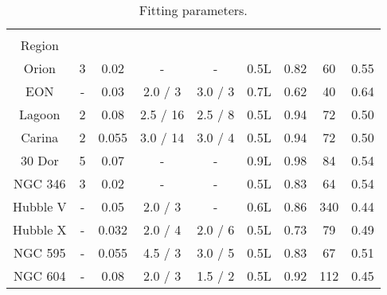 \begin{table*}
\begin{center}\caption{Fitting parameters.}
\begin{tabular}{cCCCCCCCC}\toprule
\hii{}    &   &   &      &       &   &  &  & \\
Region    &   &  &  &   &   &  &  & \\
\midrule
Orion     & 3 & 0.02    &  -           &   -        & 0.5L  & 0.82 & 60  & 0.55\\
EON       & - & 0.03   &  2.0 / 3     &   3.0 / 3        & 0.7L  & 0.62 & 40 & 0.64\\
Lagoon    & 2 & 0.08    &  2.5 / 16    &   2.5 / 8  & 0.5L  & 0.94 & 72  & 0.50\\
Carina    & 2 & 0.055   &  3.0 / 14    &   3.0 / 4  & 0.5L  & 0.94 & 72  & 0.50\\
30 Dor    & 5 &  0.07   &  -           &   -        & 0.9L  & 0.98 & 84  & 0.54\\
NGC 346   & 3 & 0.02    &  -           &   -        & 0.5L  & 0.83 & 64  & 0.54\\
Hubble V  & - & 0.05    &  2.0 / 3     &   -        & 0.6L  & 0.86 & 340 & 0.44\\
Hubble X  & - & 0.032   &  2.0 / 4     &   2.0 / 6  & 0.5L  & 0.73 & 79  & 0.49\\
NGC 595   & - &  0.055  &  4.5 / 3     &   3.0 / 5  & 0.5L  & 0.83 & 67  & 0.51\\
NGC 604   & - &  0.08  &   2.0 / 3    &   1.5 / 2 & 0.5L  & 0.92 & 112 & 0.45\\
\bottomrule
\end{tabular}\label{tab:fitting-parameters}
\end{center}
\end{table*} 